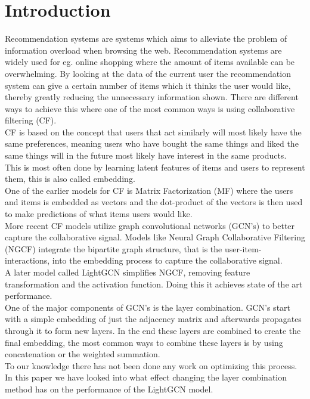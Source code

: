 \section{Introduction}
Recommendation systems are systems which aims to alleviate the problem of information overload when browsing the web.
Recommendation systems are widely used for eg. online shopping where the amount of items available can be overwhelming.
By looking at the data of the current user the recommendation system can give a certain number of items which it thinks the user would like, thereby greatly reducing the unnecessary information shown.
There are different ways to achieve this where one of the most common ways is using collaborative filtering (CF).
\\
CF is based on the concept that users that act similarly will most likely have the same preferences, meaning users who have bought the same things and liked the same things will in the future most likely have interest in the same products.
This is most often done by learning latent features of items and users to represent them, this is also called embedding.
\\
One of the earlier models for CF is Matrix Factorization (MF) where the users and items is embedded as vectors and the dot-product of the vectors is then used to make predictions of what items users would like.
\\
More recent CF models utilize graph convolutional networks (GCN's) to better capture the collaborative signal.
Models like Neural Graph Collaborative Filtering (NGCF) integrate the bipartite graph structure, that is the user-item-interactions, into the embedding process to capture the collaborative signal\cite{NGCF_2019}.
\\
A later model called LightGCN simplifies NGCF, removing feature transformation and the activation function.
Doing this it achieves state of the art performance\cite{lightgcn}.
\\
One of the major components of GCN's is the layer combination.
GCN's start with a simple embedding of just the adjacency matrix and afterwards propagates through it to form new layers.
In the end these layers are combined to create the final embedding, the most common ways to combine these layers is by using concatenation or the weighted summation.
\\
To our knowledge there has not been done any work on optimizing this process.
In this paper we have looked into what effect changing the layer combination method has on the performance of the LightGCN model.
